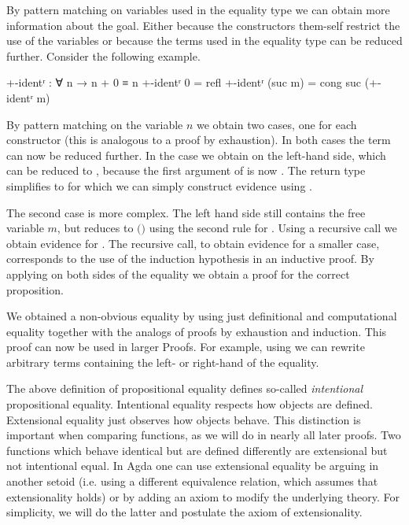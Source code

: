 By pattern matching on variables used in the equality type we can obtain more
information about the goal.
Either because the constructors them-self restrict the use of the variables or
because the terms used in the equality type can be reduced further.
Consider the following example.

\begin{code}
+-identʳ : ∀ n → n + 0 ≡ n
+-identʳ 0        = refl
+-identʳ (suc m)  = cong suc (+-identʳ m)
\end{code}
By pattern matching on the variable $n$ we obtain two cases, one for each
constructor (this is analogous to a proof by exhaustion).
In both cases the term
\AgdaSpace{}\AgdaFunction{}\AgdaSpace{}
can now be reduced further.
In the  case we obtain
\AgdaSpace{}\AgdaFunction{+}\AgdaSpace{}
on the left-hand side, which can be reduced to , because the first
argument of \AgdaFunction{+} is now .
The return type simplifies to 
\AgdaSpace{}\AgdaSpace{}
for which we can simply construct evidence using
.

The second case is more complex.
The left hand side still contains the free variable $m$, but reduces to
\AgdaSpace{}$($\AgdaSpace{}\AgdaFunction{+}\AgdaSpace{}$)$
using the second rule for \AgdaFunction{\_+\_}.
Using a recursive call we obtain evidence for
\AgdaSpace{}\AgdaFunction{+}\AgdaSpace{}\AgdaSpace{}\AgdaSpace{}.
The recursive call, to obtain evidence for a smaller case, corresponds to the use
of the induction hypothesis in an inductive proof.
By applying  on both sides of the equality we
obtain a proof for the correct proposition.

We obtained a non-obvious equality by using just definitional and computational
equality together with the analogs of proofs by exhaustion and induction.
This proof can now be used in larger Proofs.
For example, using  we can rewrite arbitrary terms containing
the left- or right-hand of the equality.

The above definition of propositional equality defines so-called
\textit{intentional} propositional equality.
Intentional equality respects how objects are defined.
Extensional equality just observes how objects behave.
This distinction is important when comparing functions, as we will do in nearly
all later proofs.
Two functions which behave identical but are defined differently are
extensional but not intentional equal.
In Agda one can use extensional equality be arguing in another setoid (i.e.
using a different equivalence relation, which assumes that extensionality holds)
or by adding an axiom to modify the underlying theory.
For simplicity, we will do the latter and postulate the axiom of extensionality.

